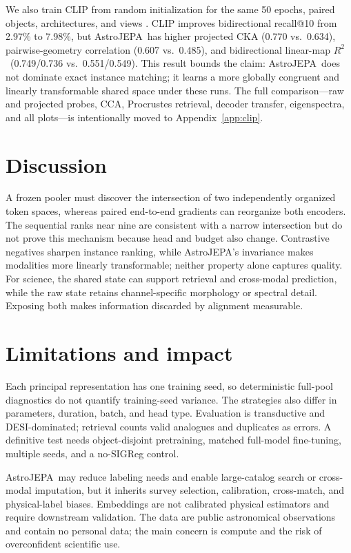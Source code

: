\documentclass{article}
\newcommand{\method}{AstroJEPA}
\newcommand{\rscore}{$R^2$}
\begin{document}
We also train CLIP from random initialization for the same 50 epochs, paired
objects, architectures, and views \citep{radford2021clip}.
CLIP improves bidirectional recall@10 from 2.97\% to 7.98\%, but \method\ has
higher projected CKA (0.770 vs.\ 0.634), pairwise-geometry correlation
(0.607 vs.\ 0.485), and bidirectional linear-map \rscore\
(0.749/0.736 vs.\ 0.551/0.549).
This result bounds the claim: \method\ does not dominate exact instance
matching; it learns a more globally congruent and linearly transformable shared
space under these runs.
The full comparison---raw and projected probes, CCA, Procrustes retrieval,
decoder transfer, eigenspectra, and all plots---is intentionally moved to
Appendix~\ref{app:clip}.

\section{Discussion}
\label{sec:discussion}

A frozen pooler must discover the intersection of two independently organized
token spaces, whereas paired end-to-end gradients can reorganize both
encoders.
The sequential ranks near nine are consistent with a narrow intersection but
do not prove this mechanism because head and budget also change.
Contrastive negatives sharpen instance ranking, while AstroJEPA's invariance
makes modalities more linearly transformable; neither property alone captures
quality.
For science, the shared state can support retrieval and cross-modal prediction,
while the raw state retains channel-specific morphology or spectral detail.
Exposing both makes information discarded by alignment measurable.

\section{Limitations and impact}
\label{sec:limitations}

Each principal representation has one training seed, so deterministic
full-pool diagnostics do not quantify training-seed variance.
The strategies also differ in parameters, duration, batch, and head type.
Evaluation is transductive and DESI-dominated; retrieval counts valid analogues
and duplicates as errors.
A definitive test needs object-disjoint pretraining, matched full-model
fine-tuning, multiple seeds, and a no-SIGReg control.

\method\ may reduce labeling needs and enable large-catalog search or
cross-modal imputation, but it inherits survey selection, calibration,
cross-match, and physical-label biases.
Embeddings are not calibrated physical estimators and require downstream
validation.
The data are public astronomical observations and contain no personal data;
the main concern is compute and the risk of overconfident scientific use.
\end{document}
